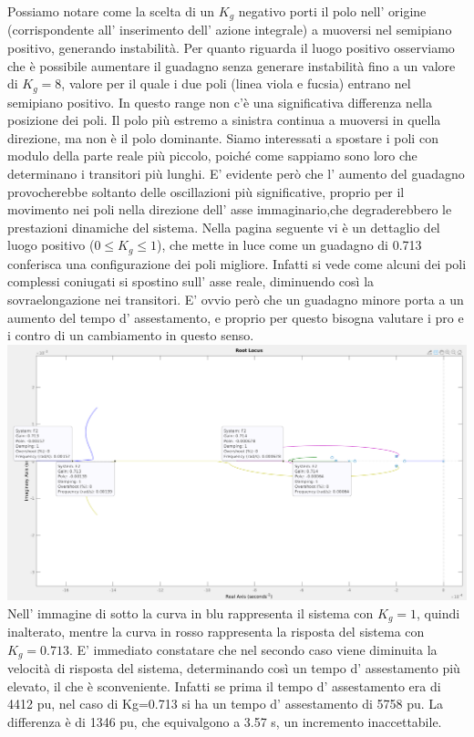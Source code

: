 \documentclass[Lau,noexaminfo]{sapthesis}
\begin{document}
	Possiamo notare come la scelta di un $K_g$ negativo porti il polo nell' origine (corrispondente all' inserimento dell' azione integrale) a muoversi nel semipiano positivo, generando instabilità. Per quanto riguarda il luogo positivo osserviamo che è possibile aumentare il guadagno senza generare instabilità fino a un valore di $K_g=8$, valore per il quale i due poli (linea viola e fucsia) entrano nel semipiano positivo. In questo range non c'è una significativa differenza nella posizione dei poli. Il polo più estremo a sinistra continua a muoversi in quella direzione, ma non è il polo dominante. Siamo interessati a spostare i poli con modulo della parte reale più piccolo, poiché come sappiamo sono loro che determinano i transitori più lunghi. E' evidente però che l' aumento del guadagno provocherebbe soltanto delle oscillazioni più significative, proprio per il movimento nei poli nella direzione dell' asse immaginario,che degraderebbero le prestazioni dinamiche del sistema.
	Nella pagina seguente vi è un dettaglio del luogo positivo ($0\le K_g\le 1$), che mette in luce come un guadagno di 0.713 conferisca una configurazione dei poli migliore. Infatti si vede come alcuni dei poli complessi coniugati si spostino sull' asse reale, diminuendo così la sovraelongazione nei transitori. E' ovvio però che un guadagno minore porta a un aumento del tempo d' assestamento, e proprio per questo bisogna valutare i pro e i contro di un cambiamento in questo senso.\\
	\includegraphics[scale=0.42,angle=90]{rlocus_F2_particolare}\\
	Nell' immagine di sotto la curva in blu rappresenta il sistema con $K_g=1$, quindi inalterato, mentre la curva in rosso rappresenta la risposta del sistema con $K_g=0.713$. E' immediato constatare che nel secondo caso viene diminuita la velocità di risposta del sistema, determinando così un tempo d' assestamento più elevato, il che è sconveniente. Infatti se prima il tempo d' assestamento era di 4412 pu, nel caso di Kg=0.713 si ha un tempo d' assestamento di 5758 pu. La differenza è di 1346 pu, che equivalgono a 3.57 s, un incremento inaccettabile.\\\\
\end{document}
